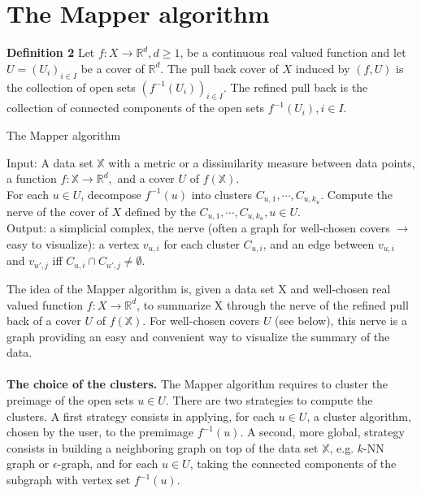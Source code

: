 \section{The Mapper algorithm}
\textbf{Definition 2} Let $f: X \rightarrow \mathbb{R}^d, d\geq 1$, be a continuous real valued function and let $U = (U_i)_{i\in I}$ be a cover of $\mathbb{R}^d$. The pull back cover of $X$ induced by $(f, U)$ is the collection of open sets $(f^{-1}(U_i))_{i\in I}$. The refined pull back is the collection of connected components of the open sets $f^{-1}(U_i), i \in I$.

\begin{algorithm}
\caption{The Mapper algorithm}
Input: A data set $\mathbb{X}$ with a metric or a dissimilarity measure between data points, a function $f: \mathbb{X} \rightarrow \mathbb{R}^d,$ and a cover $U$ of  $f(\mathbb{X}).$  \\ 
For each $u \in U$, decompose $f^{-1}(u)$ into clusters $C_{u,1}, \cdots, C_{u, k_u}$. 
Compute the nerve of the cover of $X$ defined by the $C_{u,1},\cdots, C_{u, k_u}, u \in U$. \\ 
Output: a simplicial complex, the nerve (often a graph for well-chosen covers $\rightarrow$ easy to visualize): a vertex $v_{u,i}$ for each cluster $C_{u,i}$, and an edge between $v_{u,i}$ and $v_{u',j}$ iff $C_{u,i} \cap C_{u',j} \neq \emptyset$.
\end{algorithm}

\noindent The idea of the Mapper algorithm is, given a data set X and well-chosen real valued function $f: X \rightarrow \mathbb{R}^d$, to summarize X through the nerve of the refined pull back of a cover $U$ of $f(\mathbb{X})$.
For well-chosen covers $U$ (see below), this nerve is a graph providing an easy and convenient way to visualize the summary of the data.\\\\
\textbf{The choice of the clusters.} The Mapper algorithm requires to cluster the preimage of the open sets $u \in U$. There are two strategies to compute the clusters. A first strategy consists in applying, for each $u \in U$, a cluster algorithm, chosen by the user, to the premimage $f^{-1}(u)$. A second, more global, strategy consists in building a neighboring graph on top of the data set $\mathbb{X}$, e.g. $k$-NN graph or $\epsilon$-graph, and for each $u \in U$, taking the connected components of the subgraph with vertex set $f^{-1}(u)$.